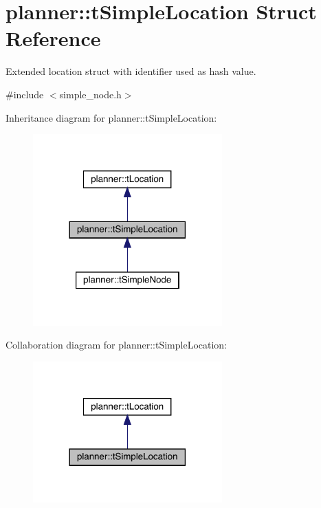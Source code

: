 \hypertarget{structplanner_1_1t_simple_location}{}\section{planner\+:\+:t\+Simple\+Location Struct Reference}
\label{structplanner_1_1t_simple_location}


Extended location struct with identifier used as hash value.  




{\ttfamily \#include $<$simple\+\_\+node.\+h$>$}



Inheritance diagram for planner\+:\+:t\+Simple\+Location\+:
\nopagebreak
\begin{figure}[H]
\begin{center}
\leavevmode
\includegraphics[width=206pt]{structplanner_1_1t_simple_location__inherit__graph}
\end{center}
\end{figure}


Collaboration diagram for planner\+:\+:t\+Simple\+Location\+:
\nopagebreak
\begin{figure}[H]
\begin{center}
\leavevmode
\includegraphics[width=206pt]{structplanner_1_1t_simple_location__coll__graph}
\end{center}
\end{figure}
